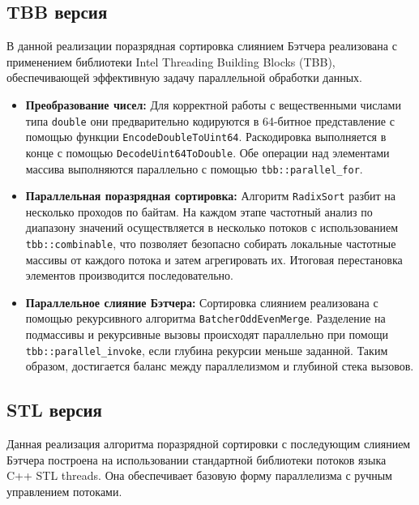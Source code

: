 \documentclass[12pt]{article}
\begin{document}
\subsection{TBB версия}

В данной реализации поразрядная сортировка слиянием Бэтчера реализована с применением библиотеки Intel Threading Building Blocks (TBB), обеспечивающей эффективную задачу параллельной обработки данных.

\begin{itemize}
  \item \textbf{Преобразование чисел:}  
  Для корректной работы с вещественными числами типа \texttt{double} они предварительно кодируются в 64-битное представление с помощью функции \texttt{EncodeDoubleToUint64}. Раскодировка выполняется в конце с помощью \texttt{DecodeUint64ToDouble}. Обе операции над элементами массива выполняются параллельно с помощью \texttt{tbb::parallel\_for}.

  \item \textbf{Параллельная поразрядная сортировка:}  
  Алгоритм \texttt{RadixSort} разбит на несколько проходов по байтам. На каждом этапе частотный анализ по диапазону значений осуществляется в несколько потоков с использованием \texttt{tbb::combinable}, что позволяет безопасно собирать локальные частотные массивы от каждого потока и затем агрегировать их. Итоговая перестановка элементов производится последовательно.

  \item \textbf{Параллельное слияние Бэтчера:}  
  Сортировка слиянием реализована с помощью рекурсивного алгоритма \texttt{BatcherOddEvenMerge}. Разделение на подмассивы и рекурсивные вызовы происходят параллельно при помощи \texttt{tbb::parallel\_invoke}, если глубина рекурсии меньше заданной. Таким образом, достигается баланс между параллелизмом и глубиной стека вызовов.
\end{itemize}

\subsection{STL версия}

Данная реализация алгоритма поразрядной сортировки с последующим слиянием Бэтчера построена на использовании стандартной библиотеки потоков языка C++ STL threads. Она обеспечивает базовую форму параллелизма с ручным управлением потоками.
\end{document}
